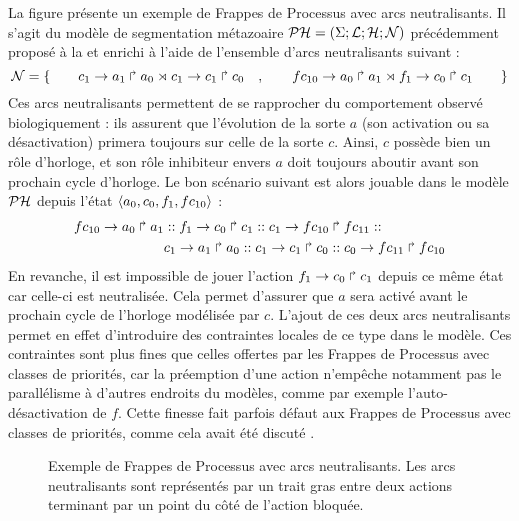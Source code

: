 \begin{example}
  La figure  présente un exemple de Frappes de Processus
  avec arcs neutralisants.
  Il s'agit du modèle de segmentation métazoaire $\mathcal{PH} = (\Sigma; \mathcal{L}; \mathcal{H}; \mathcal{N})$
  précédemment proposé à la 
  et enrichi à l'aide de l'ensemble d'arcs neutralisants suivant :
  \[\mathcal{N} = \{ \qquad c_1\rightarrow a_1\Rsh a_0\rtimes c_1\rightarrow c_1\Rsh c_0\quad,\qquad
    fc_{10}\rightarrow a_0\Rsh a_1\rtimes f_1\rightarrow c_0\Rsh c_1\qquad\}\]
  Ces arcs neutralisants permettent de se rapprocher du comportement observé biologiquement :
  ils assurent que l'évolution de la sorte $a$
  (son activation ou sa désactivation) primera toujours sur celle de la sorte $c$.
  Ainsi, $c$ possède bien un rôle d'horloge, et son rôle inhibiteur envers $a$
  doit toujours aboutir avant son prochain cycle d'horloge.
  Le bon scénario suivant est alors jouable dans le modèle $\mathcal{PH}$ depuis l'état
  $\mbox{$\langle a_0, c_0, f_1, fc_{10} \rangle$}$ :
  \begin{align*}
    fc_{10}\rightarrow a_0\Rsh a_1 &::
    f_1\rightarrow c_0\Rsh c_1 ::
    c_1\rightarrow fc_{10}\Rsh fc_{11} :: \\
    &c_1\rightarrow a_1\Rsh a_0 ::
    c_1\rightarrow c_1\Rsh c_0 ::
    c_0\rightarrow fc_{11}\Rsh fc_{10}
  \end{align*}
  En revanche, il est impossible de jouer l'action $f_1\rightarrow c_0\Rsh c_1$ depuis ce même état
  car celle-ci est neutralisée.
  Cela permet d'assurer que $a$ sera activé avant le prochain cycle de l'horloge
  modélisée par $c$.
  L'ajout de ces deux arcs neutralisants permet en effet
  d'introduire des contraintes locales de ce type dans le modèle.
  Ces contraintes sont plus fines que celles offertes par les Frappes de Processus avec
  classes de priorités, car la préemption d'une action n'empêche notamment pas le parallélisme
  à d'autres endroits du modèles,
  comme par exemple l'auto-désactivation de $f$.
  Cette finesse fait parfois défaut aux Frappes de Processus avec classes de priorités,
  comme cela avait été discuté .
  
  \begin{figure}[ht]
  \begin{center}
  \end{center}
  \caption{
    Exemple de Frappes de Processus avec arcs neutralisants.
    Les arcs neutralisants sont représentés par un trait gras entre deux actions
    terminant par un point du côté de l'action bloquée.}
  \end{figure}
\end{example}

